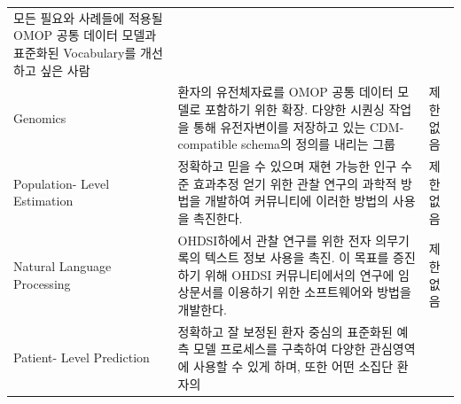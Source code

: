 \documentclass[11pt]{book}
\theoremstyle{definition}
\theoremstyle{definition}
\theoremstyle{definition}
\theoremstyle{remark}
\begin{document}
\begin{longtable}[]{@{}lll@{}}
\begin{minipage}[t]{0.37\columnwidth}
모든 필요와 사례들에 적용될OMOP 공통 데이터 모델과 표준화된 Vocabulary를
개선하고 싶은 사람\strut
\end{minipage}\tabularnewline
\begin{minipage}[t]{0.09\columnwidth}\raggedright\strut
Genomics\strut
\end{minipage} & \begin{minipage}[t]{0.46\columnwidth}\raggedright\strut
환자의 유전체자료를 OMOP 공통 데이터 모델로 포함하기 위한 확장. 다양한
시퀀싱 작업을 통해 유전자변이를 저장하고 있는 CDM-compatible schema의
정의를 내리는 그룹\strut
\end{minipage} & \begin{minipage}[t]{0.37\columnwidth}\raggedright\strut
제한 없음\strut
\end{minipage}\tabularnewline
\begin{minipage}[t]{0.09\columnwidth}\raggedright\strut
Population- Level Estimation\strut
\end{minipage} & \begin{minipage}[t]{0.46\columnwidth}\raggedright\strut
정확하고 믿을 수 있으며 재현 가능한 인구 수준 효과추정 얻기 위한 관찰
연구의 과학적 방법을 개발하여 커뮤니티에 이러한 방법의 사용을
촉진한다.\strut
\end{minipage} & \begin{minipage}[t]{0.37\columnwidth}\raggedright\strut
제한 없음\strut
\end{minipage}\tabularnewline
\begin{minipage}[t]{0.09\columnwidth}\raggedright\strut
Natural Language Processing\strut
\end{minipage} & \begin{minipage}[t]{0.46\columnwidth}\raggedright\strut
OHDSI하에서 관찰 연구를 위한 전자 의무기록의 텍스트 정보 사용을 촉진. 이
목표를 증진하기 위해 OHDSI 커뮤니티에서의 연구에 임상문서를 이용하기
위한 소프트웨어와 방법을 개발한다.\strut
\end{minipage} & \begin{minipage}[t]{0.37\columnwidth}\raggedright\strut
제한 없음\strut
\end{minipage}\tabularnewline
\begin{minipage}[t]{0.09\columnwidth}\raggedright\strut
Patient- Level Prediction\strut
\end{minipage} & \begin{minipage}[t]{0.46\columnwidth}\raggedright\strut
정확하고 잘 보정된 환자 중심의 표준화된 예측 모델 프로세스를 구축하여
다양한 관심영역에 사용할 수 있게 하며, 또한 어떤 소집단 환자의

\end{minipage}
\end{longtable}
\end{document}
